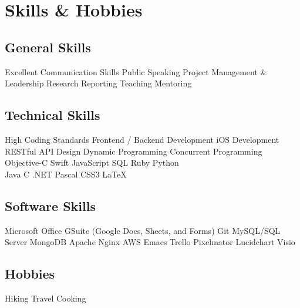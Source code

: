 \vspace{-2\bigskipamount}
\section{Skills \& Hobbies}
\small

\subsection{General Skills}
\chevron{} Excellent Communication Skills
\chevron{} Public Speaking
\chevron{} Project Management \& Leadership
\chevron{} Research
\chevron{} Reporting
\chevron{} Teaching
\chevron{} Mentoring
\medskip

\subsection{Technical Skills}
\chevron{} High Coding Standards
\chevron{} Frontend / Backend Development
\chevron{} iOS Development~
\chevron{} RESTful API Design
\chevron{} Dynamic Programming
\chevron{} Concurrent Programming
\chevron{} Objective-C
\chevron{} Swift
\chevron{} JavaScript
\chevron{} SQL
\chevron{} Ruby
\chevron{} Python
\chevron{} \Csh{}\\
\chevron{} Java
\chevron{} C
\chevron{} \Cpp{}
\chevron{} .NET
\chevron{} Pascal
\chevron{} CSS3
\chevron{} {\rmfamily\LaTeX}
\medskip

\subsection{Software Skills}
\chevron{} Microsoft Office
\chevron{} GSuite (Google Docs, Sheets, and Forms)
\chevron{} Git
\chevron{} MySQL/SQL Server
\chevron{} MongoDB
\chevron{} Apache
\chevron{} Nginx
\chevron{} AWS
\chevron{} Emacs
\chevron{} Trello
\chevron{} Pixelmator
\chevron{} Lucidchart
\chevron{} Visio
\medskip

\subsection{Hobbies}
\chevron{} Hiking
\chevron{} Travel
\chevron{} Cooking

